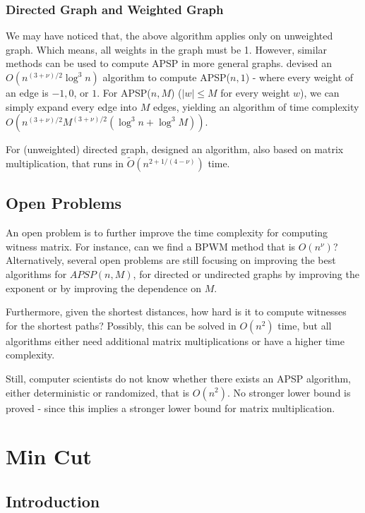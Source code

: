 \documentclass[11pt]{article}
\theoremstyle{plain}
\begin{document}
\subsubsection{Directed Graph and Weighted Graph}

We may have noticed that, the above algorithm applies only on unweighted graph. Which means, all weights in the graph must be 1. However, similar methods can be used to compute APSP in more general graphs. \cite{ALON1997255} devised an $O(n^{(3+\nu)/2}\log^3 n)$ algorithm to compute APSP($n,1$) - where every weight of an edge is $-1,0$, or $1$. For APSP($n,M$) ($|w|\le M$ for every weight $w$), we can simply expand every edge into $M$ edges, yielding an algorithm of time complexity $O(n^{(3+\nu)/2}M^{(3+\nu)/2}(\log^3 n+\log^3 M)).$

For (unweighted) directed graph, \cite{zwick2000pairsshortestpathsusing} designed an algorithm, also based on matrix multiplication, that runs in $\tilde O(n^{2+1/(4-\nu)})$ time.

\subsection{Open Problems}
An open problem is to further improve the time complexity for computing witness matrix. For instance, can we find a BPWM method that is $O(n^\nu)$? Alternatively, several open problems are still focusing on improving the best algorithms for $APSP(n, M)$, for directed or undirected graphs by improving the exponent or by improving the dependence on $M$.

Furthermore, given the shortest distances, how hard is it to compute witnesses for the shortest paths? Possibly, this can be solved in $O(n^2)$ time, but all algorithms either need additional matrix multiplications or have a higher time complexity.

Still, computer scientists do not know whether there exists an APSP algorithm, either deterministic or randomized, that is $O(n^2)$. No stronger lower bound is proved - since this implies a stronger lower bound for matrix multiplication.
\section{Min Cut}

\subsection{Introduction}\
\end{document}
